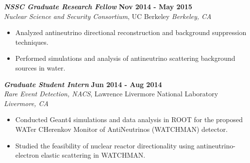 {\sl\bf NSSC Graduate Research Fellow} \hfill {\bf Nov 2014 - May 2015} \\
{\sl Nuclear Science and Security Consortium}, UC Berkeley \hfill {\sl Berkeley, CA} %
\vspace{2pt}
\begin{itemize}[leftmargin=4ex] \itemsep -2pt
\item Analyzed antineutrino directional reconstruction and background suppression techniques.
\item Performed simulations and analysis of antineutrino scattering background sources in water.
\end{itemize} 
 
{\sl\bf Graduate Student Intern} \hfill {\bf Jun 2014 - Aug 2014} \\
{\sl Rare Event Detection, NACS}, Lawrence Livermore National Laboratory \hfill {\sl Livermore, CA} %
\vspace{2pt}
\begin{itemize}[leftmargin=4ex] \itemsep -2pt
\item Conducted Geant4 simulations and data analysis in ROOT for the proposed WATer CHerenkov Monitor of AntiNeutrinos (WATCHMAN) detector.
\item Studied the feasibility of nuclear reactor directionality using antineutrino-electron elastic scattering in WATCHMAN.
\end{itemize}

